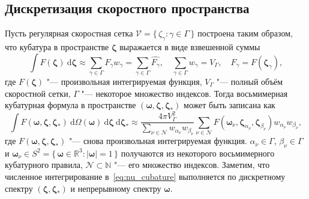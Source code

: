 \documentclass[
aps,%
12pt,%
final,%
notitlepage,%
oneside,%
onecolumn,%
nobibnotes,%
nofootinbib,%
superscriptaddress,%
noshowpacs,%
showkeys,%
centertags]%
{revtex4}
\newcommand{\dd}{\:\mathrm{d}}
\newcommand{\dzeta}{\boldsymbol{\dd\zeta}}
\newcommand{\bzeta}{\boldsymbol{\zeta}}
\newcommand{\Nu}{\mathcal{N}}
\newcommand{\Set}[2]{\{\,{#1}:{#2}\,\}}
\begin{document}
\subsection{Дискретизация скоростного пространства}

Пусть регулярная скоростная сетка \(\mathcal{V} = \Set{\zeta_\gamma}{\gamma\in\Gamma}\) построена таким образом,
что кубатура в пространстве \(\bzeta\) выражается в виде взвешенной суммы
\begin{equation}\label{eq:bzeta_cubature}
    \int F(\bzeta) \dzeta \approx \sum_{\gamma\in\Gamma} F_\gamma w_\gamma =
        \sum_{\gamma\in\Gamma} \hat{F_\gamma}, \quad
    \sum_{\gamma\in\Gamma} w_\gamma = V_\Gamma, \quad
    F_\gamma = F(\bzeta_\gamma),
\end{equation}
где \(F(\bzeta)\) "--- произвольная интегрируемая функция,
\(V_\Gamma\) "--- полный объём скоростной сетки, \(\Gamma\) "--- некоторое множество индексов.
Тогда восьмимерная кубатурная формула в пространстве \((\boldsymbol{\omega},\bzeta,\bzeta_*)\)
может быть записана как
\begin{equation}\label{eq:nu_cubature}
    \int F(\boldsymbol{\omega},\bzeta,\bzeta_*) \dd\Omega(\boldsymbol{\omega})\dzeta\dzeta_* \approx
        \frac{4\pi V_\Gamma^2}{ \sum_{\nu\in\Nu} w_{\alpha_\nu}w_{\beta_\nu} }
        \sum_{\nu\in\Nu} F(\boldsymbol{\omega}_\nu,\bzeta_{\alpha_\nu},\bzeta_{\beta_\nu}) w_{\alpha_\nu}w_{\beta_\nu},
\end{equation}
где \(F(\boldsymbol{\omega},\bzeta,\bzeta_*)\) "--- снова произвольная интегрируемая функция.
\(\alpha_\nu\in\Gamma\), \(\beta_\nu\in\Gamma\)
и \(\boldsymbol{\omega}_\nu\in S^2 = \Set{\boldsymbol{\omega}\in\mathbb{R}^3}{|\boldsymbol{\omega}| = 1}\)
получаются из некоторого восьмимерного кубатурного правила,
\(\Nu\subset\mathbb{N}\) "--- его множество индексов.
Заметим, что численное интегрирование в~\eqref{eq:nu_cubature} выполняется по
дискретному спектру \((\bzeta,\bzeta_*)\) и непрерывному спектру \(\boldsymbol{\omega}\).
\end{document}
